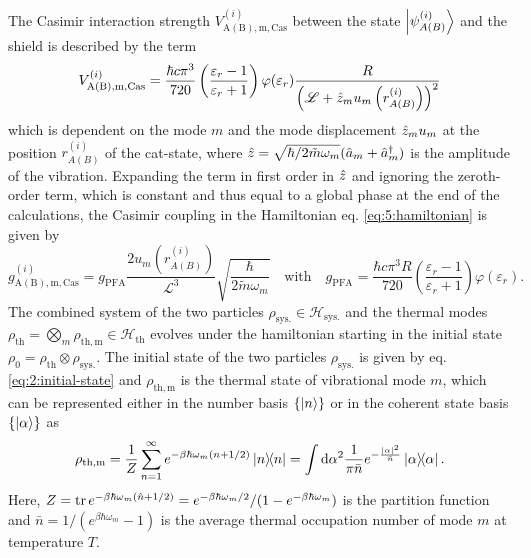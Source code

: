 The Casimir interaction strength $V^{(i)}_\mathrm{A(B),m,Cas}$ between the state $\ket{\psi^{(i)}_{A(B)}}$ and the shield is described by the term 
\begin{equation}
  V^{(i)}_\mathrm{A(B),m,Cas} = \frac{\hbar c \pi^3}{720}\left(\frac{\varepsilon_r - 1}{\varepsilon_r + 1}\right) \varphi(\varepsilon_r) \frac{R}{\left(\mathscr{L} + \hat{z}_m u_m\left(r^{(i)}_{A(B)}\right)\right)^2}
\end{equation}
which is dependent on the mode $m$ and the mode displacement $\hat{z}_m u_m$ at the position $r^{(i)}_{A(B)}$ of the cat-state, where $\hat{z} = \sqrt{\hbar/2\tilde{m}\omega_m}(\hat{a}_m + \hat{a}^\dagger_m)$ is the amplitude of the vibration.
Expanding the term in first order in $\hat{z}$ and ignoring the zeroth-order term, which is constant and thus equal to a global phase at the end of the calculations, the Casimir coupling in the Hamiltonian eq. \eqref{eq:5:hamiltonian} is given by
\begin{equation}
  g^{(i)}_\mathrm{A(B),m,Cas} = g_\mathrm{PFA} \frac{2 u_m(r^{(i)}_{A(B)})}{\mathscr{L}^3} \sqrt{\frac{\hbar}{2\tilde{m}\omega_m}}
  \quad \text{with} \quad 
  g_\mathrm{PFA} = \frac{\hbar c \pi^3 R}{720} \left(\frac{\varepsilon_r - 1}{\varepsilon_r + 1}\right) \varphi(\varepsilon_r) .
\end{equation} 
The combined system of the two particles $\rho_\mathrm{sys.} \in \mathcal{H}_\mathrm{sys.}$ and the thermal modes $\rho_\mathrm{th} = \bigotimes_m \rho_\mathrm{th, m} \in \mathcal{H}_\mathrm{th}$ evolves under the hamiltonian starting in the initial state $\rho_0 = \rho_\mathrm{th} \otimes \rho_\mathrm{sys.}$. 
The initial state of the two particles $\rho_\mathrm{sys.}$ is given by eq. \eqref{eq:2:initial-state} and $\rho_\mathrm{th,m}$ is the thermal state of vibrational mode $m$, which can be represented either in the number basis $\{\ket{n}\}$ or in the coherent state basis $\{\ket{\alpha}\}$ as \cite{Steiner_2024}
\begin{equation}
  \rho_\mathrm{th,m} = \frac{1}{Z} \sum_{n=1}^\infty e^{-\beta \hbar \omega_m (n + 1/2)} \ketbra{n} = \int \dd \alpha^2 \frac{1}{\pi \bar{n}} e^{-\frac{\left\lvert\alpha\right\rvert^2}{\bar{n}}} \ketbra{\alpha} .
\end{equation} 
Here, $Z = \tr e^{-\beta \hbar \omega_m (\hat{n}+1/2)} = e^{-\beta \hbar \omega_m/2}/(1-e^{-\beta \hbar \omega_m})$ is the partition function and $\bar{n} = 1/(e^{\beta \hbar \omega_m} - 1)$ is the average thermal occupation number of mode $m$ at temperature $T$. 

